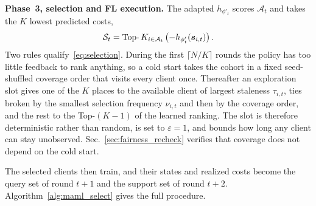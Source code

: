 \documentclass[journal]{IEEEtran}
\theoremstyle{remark}
\newcommand{\revision}[1]{#1}
\newcommand{\revtwo}[1]{#1}
\begin{document}
\textbf{Phase~3\revtwo{, selection and FL execution}.}
\revision{The adapted $h_{\phi'_t}$ scores $\mathcal{A}_t$ and takes the $K$ lowest predicted costs,}
\begin{equation}
	\color{black}
	\mathcal{S}_t = \operatorname{Top-}K_{i \in \mathcal{A}_t} \left( -h_{\phi'_t}(\bm{s}_{i,t}) \right).
	\label{eq:selection}
\end{equation}
\revtwo{Two rules qualify~\eqref{eq:selection}. During the first $\lceil N/K\rceil$ rounds the policy has too little feedback to rank anything, so a cold start takes the cohort in a fixed seed-shuffled coverage order that visits every client once. Thereafter an exploration slot gives one of the $K$ places to the available client of largest staleness $\tau_{i,t}$, ties broken by the smallest selection frequency $\nu_{i,t}$ and then by the coverage order, and the rest to the Top-$(K-1)$ of the learned ranking. The slot is therefore deterministic rather than random, is set to $\varepsilon=1$, and bounds how long any client can stay unobserved. Sec.~\ref{sec:fairness_recheck} verifies that coverage does not depend on the cold start.}

\revision{The selected clients then train, and their states and realized costs become the query set of round $t+1$ and the support set of round $t+2$. Algorithm~\ref{alg:maml_select} gives the full procedure.}
\end{document}
